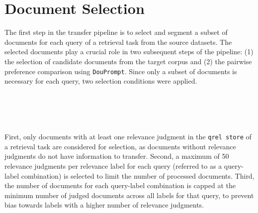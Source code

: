 \section{Document Selection}\label{eval-doucment-selection}

The first step in the transfer pipeline is to select and segment a subset of documents for each query of a retrieval task from the source datasets. The selected documents play a crucial role in two subsequent steps of the pipeline: (1) the selection of candidate documents from the target corpus and (2) the pairwise preference comparison using \texttt{DouPrompt}. Since only a subset of documents is necessary for each query, two selection conditions were applied.
\begin{table}[t]
  \centering
  \caption{The table presents the results of the candidate selection process, showing the minimum (min), maximum (max), and average (mean) number of documents per query for each source dataset. A maximum of 50 documents per query is possible.}
  \label{tab:document-selection}
\end{table}
\\\\\\\\
First, only documents with at least one relevance judgment in the \texttt{qrel store} of a retrieval task are considered for selection, as documents without relevance judgments do not have information to transfer. Second, a maximum of 50 relevance judgments per relevance label for each query (referred to as a query-label combination) is selected to limit the number of processed documents. Third, the number of documents for each query-label combination is capped at the minimum number of judged documents across all labels for that query, to prevent bias towards labels with a higher number of relevance judgments.
